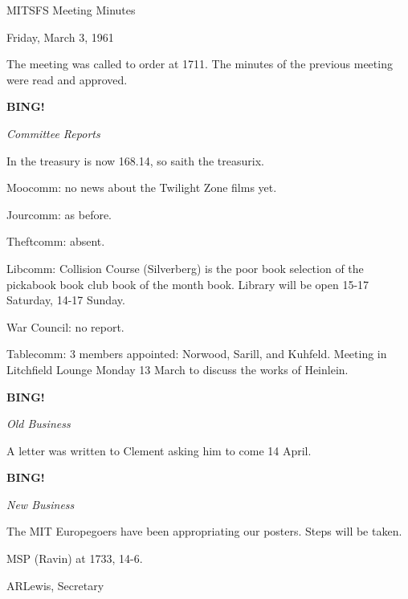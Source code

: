 \documentclass[12pt]{article}
\newcommand{\bing}{{\bf BING!} }
\newcommand{\goto}[1]{\bing \vskip 12pt \centerline{{\em{#1}}}}
\begin{document}
\begin{center}

MITSFS Meeting Minutes

Friday, March 3, 1961

\end{center}
 
\vspace{12pt}

\setlength{\parskip}{6pt}

\noindent
The meeting was called to order at 1711. The minutes of the previous meeting were read and approved.

\goto{Committee Reports}

In the treasury is now 168.14, so saith the treasurix.

Moocomm: no news about the Twilight Zone films yet.

Jourcomm: as before.

Theftcomm: absent.

Libcomm: Collision Course (Silverberg) is the poor book selection of the pickabook book club book of the month book. Library will be open 15-17 Saturday, 14-17 Sunday.

War Council: no report.

Tablecomm: 3 members appointed: Norwood, Sarill, and Kuhfeld. Meeting in Litchfield Lounge Monday 13 March to discuss the works of Heinlein.

\goto{Old Business}

A letter was written to Clement asking him to come 14 April.

\goto{New Business}

The MIT Europegoers have been appropriating our posters. Steps will be taken.

MSP (Ravin) at 1733, 14-6.

\vspace{12pt}

\centerline{ARLewis, Secretary}
\end{document}
